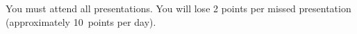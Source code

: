 \documentclass[10pt]{article}
\begin{document}
\begin{landscape}
\medskip

You must attend all presentations. You will lose 2 points per missed presentation (approximately 10~points per day).

\end{landscape}
\end{document}
